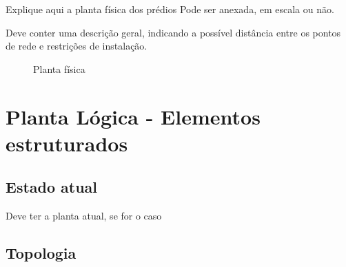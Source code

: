 \documentclass[	DIV=calc,%
paper=a4,%
fontsize=12pt,%
onecolumn]{scrartcl}	 					%
\begin{document}
	Explique aqui a planta física dos prédios
	Pode ser anexada, em escala ou não.
	
	Deve conter uma descrição geral, indicando a possível distância entre os pontos de rede e restrições de instalação.
	\clearpage
	\recalctypearea
	
	\begin{figure}
		\noindent{}
		\caption{Planta física}
		\label{fig1}
	\end{figure}
	
	\clearpage
	\recalctypearea
	\section{Planta Lógica - Elementos estruturados}
	
	\subsection{Estado atual}
	Deve ter a planta atual, se for o caso
	
	\subsection{Topologia}
	
\end{document}

